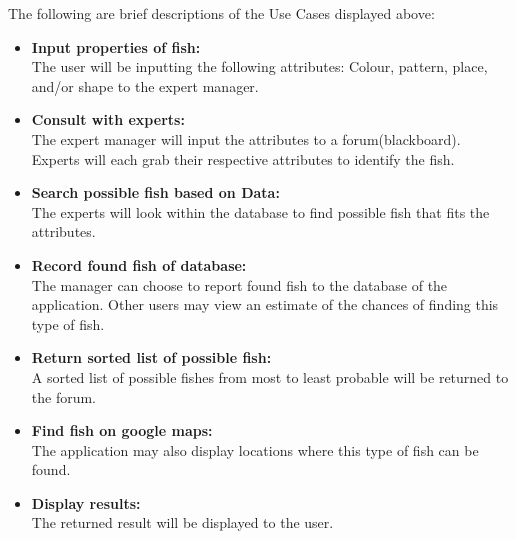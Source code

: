 \documentclass[]{article}
\begin{document}
\FloatBarrier

The following are brief descriptions of the Use Cases displayed above:
\begin{itemize}
\item \textbf{Input properties of fish:} \\
The user will be inputting the following attributes: Colour, pattern, place, and/or shape to the expert manager.
\item \textbf{Consult with experts:} \\
The expert manager will input the attributes to a forum(blackboard). Experts will each grab their respective attributes to identify the fish.
\item \textbf{Search possible fish based on Data:} \\
The experts will look within the database to find possible fish that fits the attributes.
\item \textbf{Record found fish of database:} \\
The manager can choose to report found fish to the database of the application. Other users may view an estimate of the chances of finding this type of fish.
\item \textbf{Return sorted list of possible fish:} \\
A sorted list of possible fishes from most to least probable will be returned to the forum.
\item \textbf{Find fish on google maps:} \\
The application may also display locations where this type of fish can be found.
\item \textbf{Display results:} \\
The returned result will be displayed to the user.
\end{itemize}
\end{document}
